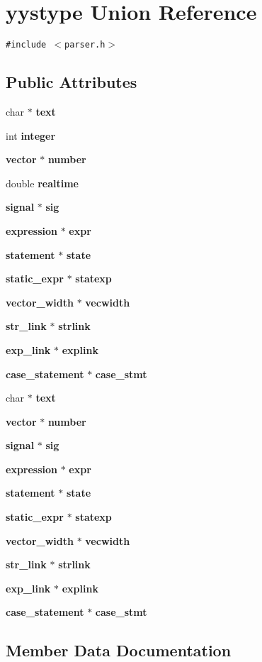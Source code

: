 \section{yystype  Union Reference}
\label{unionyystype}
{\tt \#include $<$parser.h$>$}

\subsection*{Public Attributes}
\begin{CompactItemize}
\item 
char $\ast$ {\bf text}
\item 
int {\bf integer}
\item 
{\bf vector} $\ast$ {\bf number}
\item 
double {\bf realtime}
\item 
{\bf signal} $\ast$ {\bf sig}
\item 
{\bf expression} $\ast$ {\bf expr}
\item 
{\bf statement} $\ast$ {\bf state}
\item 
{\bf static\_\-expr} $\ast$ {\bf statexp}
\item 
{\bf vector\_\-width} $\ast$ {\bf vecwidth}
\item 
{\bf str\_\-link} $\ast$ {\bf strlink}
\item 
{\bf exp\_\-link} $\ast$ {\bf explink}
\item 
{\bf case\_\-statement} $\ast$ {\bf case\_\-stmt}
\item 
char $\ast$ {\bf text}
\item 
{\bf vector} $\ast$ {\bf number}
\item 
{\bf signal} $\ast$ {\bf sig}
\item 
{\bf expression} $\ast$ {\bf expr}
\item 
{\bf statement} $\ast$ {\bf state}
\item 
{\bf static\_\-expr} $\ast$ {\bf statexp}
\item 
{\bf vector\_\-width} $\ast$ {\bf vecwidth}
\item 
{\bf str\_\-link} $\ast$ {\bf strlink}
\item 
{\bf exp\_\-link} $\ast$ {\bf explink}
\item 
{\bf case\_\-statement} $\ast$ {\bf case\_\-stmt}
\end{CompactItemize}


\subsection{Member Data Documentation}
